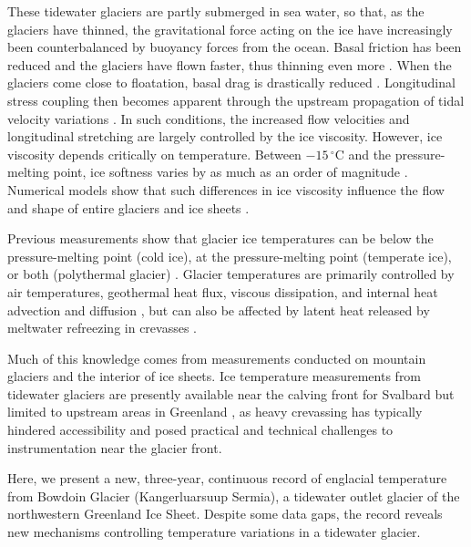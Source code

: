 \documentclass[utf8]{article}
\begin{document}
    These tidewater glaciers are partly submerged in sea water, so that, as the
    glaciers have thinned, the gravitational force acting on the ice have
    increasingly been counterbalanced by buoyancy forces from the ocean. Basal
    friction has been reduced and the glaciers have flown faster, thus thinning
    even more
    \citep{Meier.Post.1987}. When the glaciers come close to floatation,
    basal drag is drastically reduced \citep{Shapero.etal.2016}.
    Longitudinal stress coupling then becomes apparent through the upstream
    propagation of tidal velocity variations \citep{Walters.1989,
    Walter.etal.2012, Sugiyama.etal.2014, Podolskiy.etal.2017,
    Seddik.etal.2019}. In such conditions, the increased flow velocities and
    longitudinal stretching are largely controlled by the ice viscosity.
    However, ice viscosity depends critically on temperature. Between
    $-15\,^\circ$C and the pressure-melting point, ice softness varies by as
    much as an order of magnitude \citep[p.~72]{Cuffey.Paterson.2010}.
    Numerical models show that such differences
    in ice viscosity influence the flow and shape of entire glaciers and ice
    sheets \citep[e.g. Figs.~2 and~7 of][]{Seguinot.etal.2016}.

    Previous measurements show that glacier ice temperatures can be below
    the pressure-melting point (cold ice), at the pressure-melting point
    (temperate ice), or both (polythermal glacier)
    \citep[p.~399]{Ahlmann.1935, Cuffey.Paterson.2010}. Glacier temperatures
    are primarily controlled by air temperatures, geothermal heat flux, viscous
    dissipation, and internal heat advection and diffusion \citep{Q-Robin.1955},
    but can also be affected by latent heat released by meltwater refreezing in
    crevasses \citep{Phillips.etal.2010, Phillips.etal.2013, Colgan.etal.2011,
    Luthi.etal.2015}.

    Much of this knowledge comes from measurements conducted on mountain
    glaciers and the interior of ice sheets. Ice temperature measurements from
    tidewater glaciers are presently available near the calving front for
    Svalbard \citep{Jania.etal.1996} but limited to upstream areas in Greenland
    \citep{Iken.etal.1993, Luthi.etal.2002, Luthi.etal.2015, Doyle.etal.2018},
    as heavy crevassing has typically hindered accessibility and posed
    practical and
    technical challenges to instrumentation near the glacier front.

    Here, we present a new, three-year, continuous record of englacial
    temperature from Bowdoin Glacier (Kangerluarsuup Sermia), a tidewater outlet
    glacier of the northwestern Greenland Ice Sheet. Despite some data gaps,
    the record reveals new mechanisms controlling temperature variations in a
    tidewater glacier.
\end{document}
